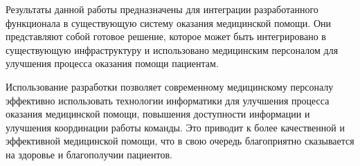 Результаты данной работы предназначены для интеграции разработанного функционала в существующую систему оказания медицинской помощи. Они представляют собой готовое решение, которое может быть интегрировано в существующую инфраструктуру и использовано медицинским персоналом для улучшения процесса оказания помощи пациентам.


Использование разработки позволяет современному медицинскому персоналу эффективно использовать технологии информатики для улучшения процесса оказания медицинской помощи, повышения доступности информации и улучшения координации работы команды. Это приводит к более качественной и эффективной медицинской помощи, что в свою очередь благоприятно сказывается на здоровье и благополучии пациентов.


